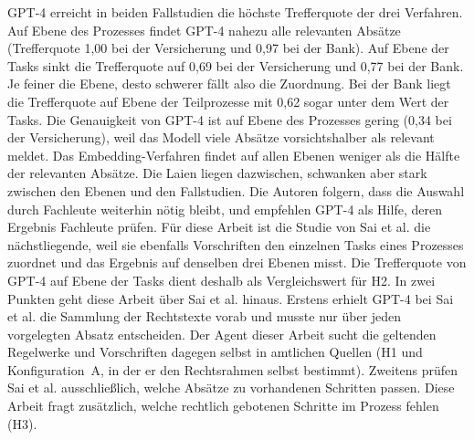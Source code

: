 GPT-4 erreicht in beiden Fallstudien die höchste Trefferquote der drei Verfahren.
Auf Ebene des Prozesses findet GPT-4 nahezu alle relevanten Absätze (Trefferquote 1,00 bei der Versicherung und 0,97 bei der Bank).
Auf Ebene der Tasks sinkt die Trefferquote auf 0,69 bei der Versicherung und 0,77 bei der Bank.
Je feiner die Ebene, desto schwerer fällt also die Zuordnung.
Bei der Bank liegt die Trefferquote auf Ebene der Teilprozesse mit 0,62 sogar unter dem Wert der Tasks.
Die Genauigkeit von GPT-4 ist auf Ebene des Prozesses gering (0,34 bei der Versicherung), weil das Modell viele Absätze vorsichtshalber als relevant meldet.
Das Embedding-Verfahren findet auf allen Ebenen weniger als die Hälfte der relevanten Absätze.
Die Laien liegen dazwischen, schwanken aber stark zwischen den Ebenen und den Fallstudien.
Die Autoren folgern, dass die Auswahl durch Fachleute weiterhin nötig bleibt, und empfehlen GPT-4 als Hilfe, deren Ergebnis Fachleute prüfen.
Für diese Arbeit ist die Studie von Sai et al. die nächstliegende, weil sie ebenfalls Vorschriften den einzelnen Tasks eines Prozesses zuordnet und das Ergebnis auf denselben drei Ebenen misst.
Die Trefferquote von GPT-4 auf Ebene der Tasks dient deshalb als Vergleichswert für H2.
In zwei Punkten geht diese Arbeit über Sai et al. hinaus.
Erstens erhielt GPT-4 bei Sai et al. die Sammlung der Rechtstexte vorab und musste nur über jeden vorgelegten Absatz entscheiden.
Der Agent dieser Arbeit sucht die geltenden Regelwerke und Vorschriften dagegen selbst in amtlichen Quellen (H1 und Konfiguration~A, in der er den Rechtsrahmen selbst bestimmt).
Zweitens prüfen Sai et al. ausschließlich, welche Absätze zu vorhandenen Schritten passen.
Diese Arbeit fragt zusätzlich, welche rechtlich gebotenen Schritte im Prozess fehlen (H3).


